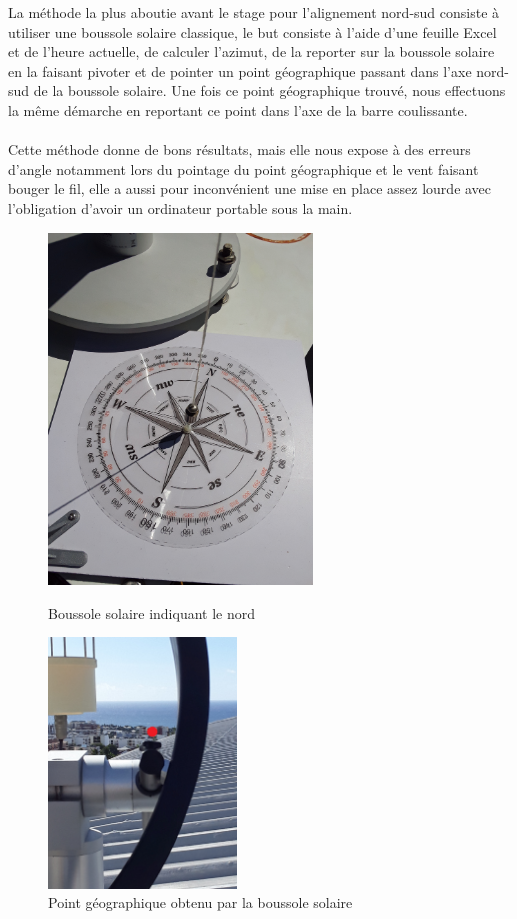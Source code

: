 \documentclass[12pt,a4paper]{article}
\begin{document}
\begin{flushleft}
La méthode la plus aboutie avant le stage pour l'alignement nord-sud consiste à utiliser une boussole solaire classique, le but consiste à l'aide d'une feuille Excel et de l'heure actuelle, de calculer l'azimut, de la reporter sur la boussole solaire en la faisant pivoter et de pointer un point géographique passant dans l'axe nord-sud de la boussole solaire. Une fois ce point géographique trouvé, nous effectuons la même démarche en reportant ce point dans l'axe de la barre coulissante.\\
~\\
Cette méthode donne de bons résultats, mais elle nous expose à des erreurs d'angle notamment lors du pointage du point géographique et le vent faisant bouger le fil, elle a aussi pour inconvénient une mise en place assez lourde avec l'obligation d'avoir un ordinateur portable sous la main.\\	

\begin{figure}[H]
    \begin{minipage}[c]{.46\linewidth}
        \centering
        \includegraphics[width=7cm, angle=-90]{image/montage/5.jpg} 
\caption{Boussole solaire indiquant le nord}
    \end{minipage}
    \hfill%
    \begin{minipage}[c]{.46\linewidth}
        \centering
        \includegraphics[width=5cm]{image/montage/6.jpg} 
\caption{Point géographique obtenu par la boussole solaire}
    \end{minipage}
\end{figure}



\end{flushleft}
\end{document}
